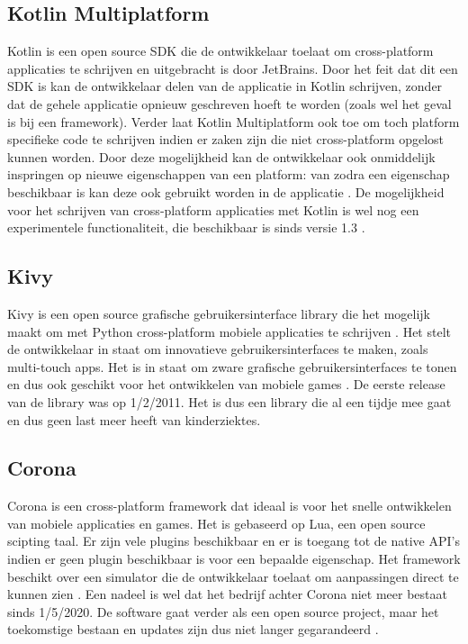 \subsection{Kotlin Multiplatform}
\label{subsec:Kotlin}

Kotlin is een open source SDK die de ontwikkelaar toelaat om cross-platform applicaties te schrijven en uitgebracht is door JetBrains. Door het feit dat dit een SDK is kan de ontwikkelaar delen van de applicatie in Kotlin schrijven, zonder dat de gehele applicatie opnieuw geschreven hoeft te worden (zoals wel het geval is bij een framework). Verder laat Kotlin Multiplatform ook toe om toch platform specifieke code te schrijven indien er zaken zijn die niet cross-platform opgelost kunnen worden. Door deze mogelijkheid kan de ontwikkelaar ook onmiddelijk inspringen op nieuwe eigenschappen van een platform: van zodra een eigenschap beschikbaar is kan deze ook gebruikt worden in de applicatie \autocite{JetBrains2020}. De mogelijkheid voor het schrijven van cross-platform applicaties met Kotlin is wel nog een experimentele functionaliteit, die beschikbaar is sinds versie 1.3 \autocite{Belov2018}.


\subsection{Kivy}
\label{subsec:Kivy}

Kivy is een open source grafische gebruikersinterface library die het mogelijk maakt om met Python cross-platform mobiele applicaties te schrijven \autocite{Vasilkov2015}. Het stelt de ontwikkelaar in staat om innovatieve gebruikersinterfaces te maken, zoals multi-touch apps. Het is in staat om zware grafische gebruikersinterfaces te tonen en dus ook geschikt voor het ontwikkelen van mobiele games \autocite{Kivy2020}. De eerste release van de library was op 1/2/2011. Het is dus een library die al een tijdje mee gaat en dus geen last meer heeft van kinderziektes.

\subsection{Corona}
\label{subsec:Corona}

Corona is een cross-platform framework dat ideaal is voor het snelle ontwikkelen van mobiele applicaties en games. Het is gebaseerd op Lua, een open source scipting taal. Er zijn vele plugins beschikbaar en er is toegang tot de native API's indien er geen plugin beschikbaar is voor een bepaalde eigenschap. Het framework beschikt over een simulator die de ontwikkelaar toelaat om aanpassingen direct te kunnen zien \autocite{Coronalabs2020}. Een nadeel is wel dat het bedrijf achter Corona niet meer bestaat sinds 1/5/2020. De software gaat verder als een open source project, maar het toekomstige bestaan en updates zijn dus niet langer gegarandeerd \autocite{Shcherban2020}.

